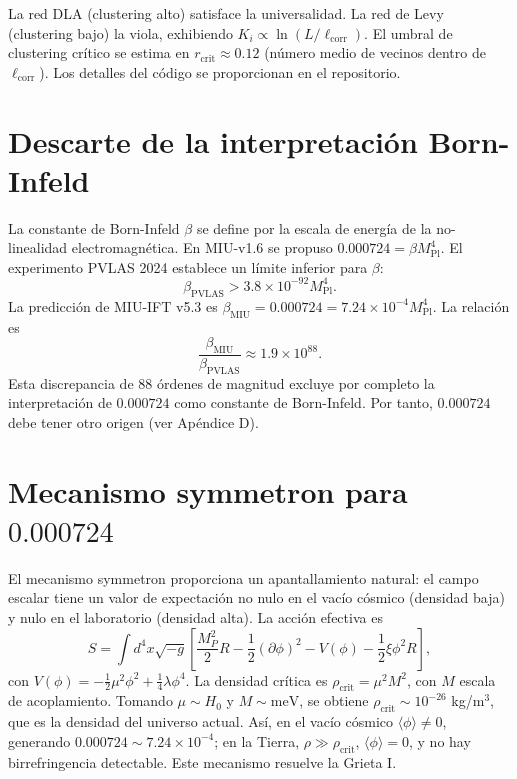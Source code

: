 \documentclass[12pt, a4paper]{article}
\theoremstyle{miuThm}
\theoremstyle{remark}
\newcommand{\eps}{0.000724}
\begin{document}
La red DLA (clustering alto) satisface la universalidad. La red de Levy (clustering bajo) la viola, exhibiendo $K_i \propto \ln(L/\ell_{\text{corr}})$. El umbral de clustering crítico se estima en $r_{\text{crit}} \approx 0.12$ (número medio de vecinos dentro de $\ell_{\text{corr}}$). Los detalles del código se proporcionan en el repositorio.

\clearpage
\section{Descarte de la interpretación Born-Infeld}
\label{app:BI}

La constante de Born-Infeld $\beta$ se define por la escala de energía de la no-linealidad electromagnética. En MIU-v1.6 se propuso $\eps = \beta M_{\text{Pl}}^4$. El experimento PVLAS 2024 \cite{DellaValle2024} establece un límite inferior para $\beta$:
\begin{equation}
\beta_{\text{PVLAS}} > 3.8 \times 10^{-92} M_{\text{Pl}}^4.
\end{equation}
La predicción de MIU-IFT v5.3 es $\beta_{\text{MIU}} = \eps = 7.24\times10^{-4} M_{\text{Pl}}^4$. La relación es
\begin{equation}
\frac{\beta_{\text{MIU}}}{\beta_{\text{PVLAS}}} \approx 1.9 \times 10^{88}.
\end{equation}
Esta discrepancia de 88 órdenes de magnitud excluye por completo la interpretación de $\eps$ como constante de Born-Infeld. Por tanto, $\eps$ debe tener otro origen (ver Apéndice D).

\clearpage
\section{Mecanismo symmetron para $\eps$}
\label{app:symmetron}

El mecanismo symmetron \cite{Chameleon2025} proporciona un apantallamiento natural: el campo escalar tiene un valor de expectación no nulo en el vacío cósmico (densidad baja) y nulo en el laboratorio (densidad alta). La acción efectiva es
\begin{equation}
S = \int d^4x \sqrt{-g} \left[ \frac{M_P^2}{2} R - \frac12 (\partial\phi)^2 - V(\phi) - \frac12 \xi \phi^2 R \right],
\end{equation}
con $V(\phi) = -\frac12 \mu^2 \phi^2 + \frac14 \lambda \phi^4$. La densidad crítica es $\rho_{\text{crit}} = \mu^2 M^2$, con $M$ escala de acoplamiento. Tomando $\mu \sim H_0$ y $M \sim \text{meV}$, se obtiene $\rho_{\text{crit}} \sim 10^{-26}$ kg/m$^3$, que es la densidad del universo actual. Así, en el vacío cósmico $\langle\phi\rangle \neq 0$, generando $\eps \sim 7.24\times10^{-4}$; en la Tierra, $\rho \gg \rho_{\text{crit}}$, $\langle\phi\rangle = 0$, y no hay birrefringencia detectable. Este mecanismo resuelve la Grieta I.
\end{document}

